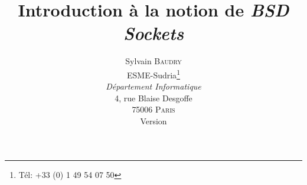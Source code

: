 \documentclass[titlepage,twoside,a4paper]{book}
\title{
	Introduction {\`a} la notion de {\sl BSD Sockets}
}
\author{
	Sylvain \textsc{Baudry}\\[3ex]
	ESME-Sudria\thanks{T{\'e}l: +33 (0) 1 49 54 07 50}\\
	\textsl{D{\'e}partement Informatique}\\
	4, rue Blaise Desgoffe\\
	75006 \textsc{Paris}\\[3ex]
	Version \docversion
}
\date{\docdate}
\newcounter{remarque-cnt}
\begin{document}
\newenvironment{remarque}{
	\begin{sloppypar}
	\noindent
	\textbf{Remarque~\arabic{remarque-cnt}~:}\\
	\hspace*{\fill} \linebreak \vspace{-7ex}
	\begin{quote}\it
}
{	
	\end{quote}
	\stepcounter{remarque-cnt}
	\end{sloppypar}
}



\maketitle				%

\clearpage				%
\newpage

\tableofcontents

\clearpage
\listoffigures

\clearpage
\listoftables


\mainmatter













\clearpage
\newpage
\printindex
%
%
\end{document}
